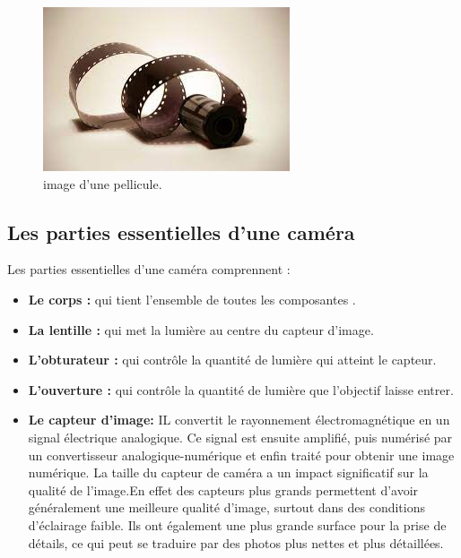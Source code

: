 \begin{figure}[h]
	\centering
	\includegraphics[scale=0.80]{image/pellicule.jpeg}
	\decoRule
	\caption[Pellicule]{image d'une pellicule.}
	\label{fig:Pellicule}
\end{figure}

\subsection{Les parties essentielles d'une caméra}
Les parties essentielles d’une caméra comprennent : \\
\begin{itemize}
	\item \textbf{Le corps :} qui tient l'ensemble de toutes les composantes . \\
	
	\item \textbf{La lentille :} qui met la lumière au centre du capteur d’image. \\
	
	\item \textbf{L’obturateur :} qui contrôle la quantité de lumière qui atteint le capteur.\\ 
	
	\item \textbf{L’ouverture :} qui contrôle la quantité de lumière que l’objectif laisse entrer. \\
	
	\item \textbf{Le capteur d'image:} IL convertit le rayonnement électromagnétique en un signal électrique analogique. Ce signal est ensuite amplifié, puis numérisé par un convertisseur analogique-numérique et enfin traité pour obtenir une image numérique. La taille du capteur de caméra a un impact significatif sur la qualité de l’image.En effet des capteurs plus grands permettent d'avoir généralement une meilleure qualité d’image, surtout dans des conditions d’éclairage faible. Ils ont également une plus grande surface pour la prise de détails, ce qui peut se traduire par des photos plus nettes et plus détaillées.\\
\end{itemize}

